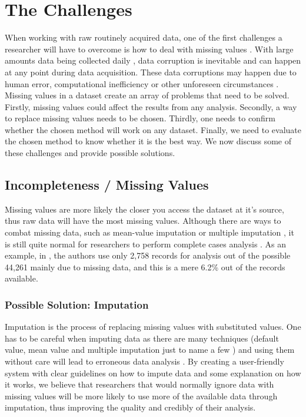\documentclass[conference,compsoc]{IEEEtran}
\begin{document}

	\section{The Challenges} %
	\label{sec:the_problems}
	When working with raw routinely acquired data, one of the first challenges a researcher will have to overcome is how to deal with missing values \cite{rountine-missing}. With large amounts data being collected daily \cite{bigData}, data corruption is inevitable and can happen at any point during data acquisition. These data corruptions may happen due to human error, computational inefficiency or other unforeseen circumstances \cite{reason}. Missing values in a dataset create an array of problems that need to be solved. Firstly, missing values could affect the results from any analysis. Secondly, a way to replace missing values needs to be chosen. Thirdly, one needs to confirm whether the chosen method will work on any dataset. Finally, we need to evaluate the chosen method to know whether it is the best way. We now discuss some of these challenges and provide possible solutions.

		\subsection{Incompleteness / Missing Values} %
		\label{sub:incompleteness}
			Missing values are more likely the closer you access the dataset at it's source, thus raw data will have the most missing values. Although there are ways to combat missing data, such as mean-value imputation or multiple imputation \cite{missing1,missing2,missing3}, it is still quite normal for researchers to perform complete cases analysis \cite{epi1,systematic1,systematic2,systematic3}. As an example, in \cite{epi1}, the authors use only 2,758 records for analysis out of the possible 44,261 mainly due to missing data, and this is a mere 6.2\% out of the records available.
			\subsubsection{Possible Solution: Imputation} %
			\label{sub:possible_solution}
				Imputation is the process of replacing missing values with substituted values. One has to be careful when imputing data as there are many techniques (default value, mean value and multiple imputation just to name a few \cite{gelman2007data}) and using them without care will lead to erroneous data analysis \cite{careful}. By creating a user-friendly system with clear guidelines on how to impute data and some explanation on how it works, we believe that researchers that would normally ignore data with missing values will be more likely to use more of the available data through imputation, thus improving the quality and credibly of their analysis.
\end{document}
